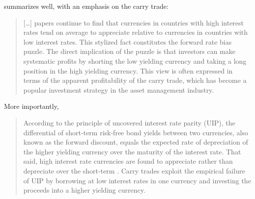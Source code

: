\documentclass[a4paper, twoside]{templates/ociamthesis}
\begin{document}
\textcite[ 1375-1376]{clarida2009} summarizes well, with an emphasis on the carry trade:

\begin{quote}
{[}\ldots{]} papers continue to find that currencies in countries with high interest rates tend on average to appreciate relative to currencies in countries with low interest rates. This stylized fact constitutes the forward rate bias puzzle. The direct implication of the puzzle is that investors can make systematic profits by shorting the low yielding currency and taking a long position in the high yielding currency. This view is often expressed in terms of the apparent profitability of the carry trade, which has become a popular investment strategy in the asset management industry.
\end{quote}

More importantly,

\begin{quote}
According to the principle of uncovered interest rate parity (UIP), the differential of short‐term risk‐free bond yields between two currencies, also known as the forward discount, equals the expected rate of depreciation of the higher yielding currency over the maturity of the interest rate. That said, high interest rate currencies are found to appreciate rather than depreciate over the short‐term \autocites[see, for instance][]{bilson1981,fama1984}. Carry trades exploit the empirical failure of UIP by borrowing at low interest rates in one currency and investing the proceeds into a higher yielding currency. \autocite[ 758]{dreher2020}
\end{quote}
\end{document}
